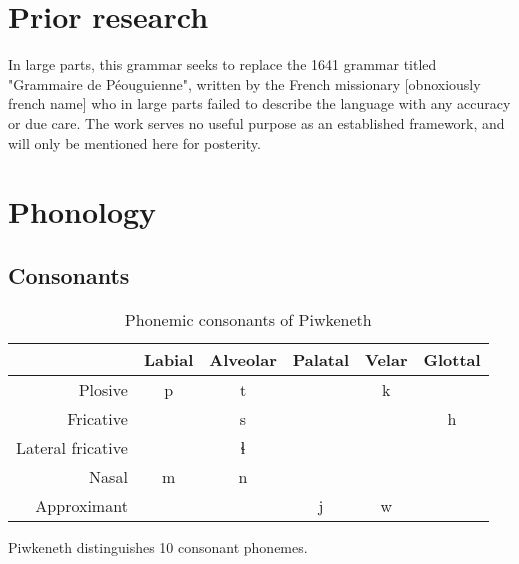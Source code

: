 \documentclass[smallroyalvopaper,9pt]{memoir} %
\newcommand{\lang}{Piwkeneth}
\newcommand{\langeng}{Pawakin}
\begin{document}
\chapter{Prior research}

In large parts, this grammar seeks to replace the 1641 grammar titled "Grammaire de Péouguienne", written by the French missionary [obnoxiously french name] who in large parts failed to describe the language with any accuracy or due care. The work serves no useful purpose as an established framework, and will only be mentioned here for posterity.

\chapter{Phonology}


\section{Consonants}

\begin{table}[ht]
    \centering
    \begin{tabular}{rccccc}
        \toprule
        & Labial & Alveolar & Palatal & Velar & Glottal \\
        \midrule
        Plosive & p & t & & k & \\
        Fricative & & s & & & h \\
        Lateral fricative & & ɬ & & & \\
        Nasal & m & n & & & \\
        Approximant & & & j & w & \\
        \bottomrule
    \end{tabular}
    \caption{Phonemic consonants of \lang}
\end{table}


\lang{} distinguishes 10 consonant phonemes.

\end{document}
